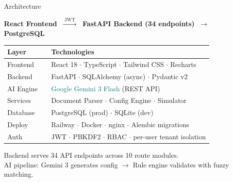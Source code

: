 \documentclass[aspectratio=169,11pt]{beamer}
\begin{document}
\begin{frame}{Architecture}
\begin{center}
{\small
\textbf{React Frontend} $\;\xrightarrow{\;\text{JWT}\;}\;$ \textbf{FastAPI Backend (34 endpoints)} $\;\xrightarrow{}\;$ \textbf{PostgreSQL}
}
\end{center}

\vspace{0.3em}
\begin{center}
{\small
\begin{tabular}{lcl}
\toprule
\textbf{Layer} & & \textbf{Technologies} \\
\midrule
Frontend & & React 18 $\cdot$ TypeScript $\cdot$ Tailwind CSS $\cdot$ Recharts \\
Backend & & FastAPI $\cdot$ SQLAlchemy (async) $\cdot$ Pydantic v2 \\
AI Engine & & \textcolor{teal}{Google Gemini 3 Flash} (REST API) \\
Services & & Document Parser $\cdot$ Config Engine $\cdot$ Simulator \\
Database & & PostgreSQL (prod) $\cdot$ SQLite (dev) \\
Deploy & & Railway $\cdot$ Docker $\cdot$ nginx $\cdot$ Alembic migrations \\
Auth & & JWT $\cdot$ PBKDF2 $\cdot$ RBAC $\cdot$ per-user tenant isolation \\
\bottomrule
\end{tabular}
}
\end{center}

\vspace{0.3em}
\begin{center}
{\small\color{ts} Backend serves 34 API endpoints across 10 route modules.\\
AI pipeline: Gemini 3 generates config $\to$ Rule engine validates with fuzzy matching.}
\end{center}
\end{frame}
\end{document}
